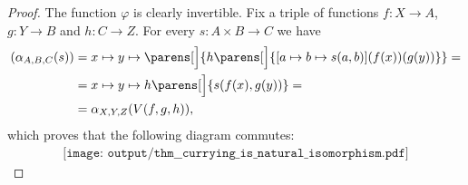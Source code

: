 \begin{proof}
  The function \( \varphi \) is clearly invertible. Fix a triple of functions \( f: X \to A \), \( g: Y \to B \) and \( h: C \to Z \). For every \( s: A \times B \to C \) we have
  \begin{align*}
    [W(f, g, h)](\alpha_{A,B,C}(s))
    &=
    x \mapsto y \mapsto \parens[\Big]{ h\parens[\Big]{ [a \mapsto b \mapsto s(a, b)](f(x))(g(y)) } }
    = \\ &=
    x \mapsto y \mapsto h\parens[\Big]{ s(f(x), g(y)) }
    = \\ &=
    \alpha_{X,Y,Z}(V(f, g, h)),
  \end{align*}
  which proves that the following diagram commutes:
  \begin{equation}\label{eq:thm:currying_is_natural_isomorphism/diagram}
    \begin{aligned}
      \texttt{[image: output/thm\_\_currying\_is\_natural\_isomorphism.pdf]}
    \end{aligned}
  \end{equation}
\end{proof}

